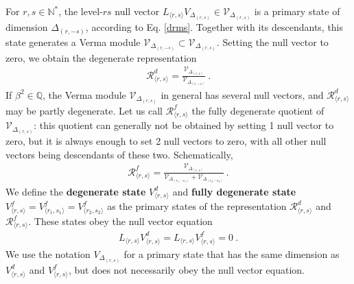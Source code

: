 \documentclass[12pt, a4paper]{article}
\newcommand{\myindex}[1]{\textbf{\boldmath #1}}
\begin{document}
For $r,s\in\mathbb{N}^*$, the level-$rs$ null vector $L_{\langle r,s\rangle}V_{\Delta_{(r,s)}}\in \mathcal{V}_{\Delta_{(r,s)}}$ is a primary state of dimension $\Delta_{(r,-s)}$, according to Eq. \eqref{drms}. Together with its descendants, this state generates a Verma module $\mathcal{V}_{\Delta_{(r,-s)}}\subset \mathcal{V}_{\Delta_{(r,s)}}$. Setting the null vector to zero, we obtain the degenerate representation 
\begin{align}
 \mathcal{R}^d_{\langle r,s\rangle} 
 =\frac{\mathcal{V}_{\Delta_{(r,s)}}}{\mathcal{V}_{\Delta_{(r,-s)}}}\ . 
 \label{rvv}
\end{align}
If $\beta^2\in \mathbb{Q}$, the Verma module $\mathcal{V}_{\Delta_{(r,s)}}$ in general has several null vectors, and $\mathcal{R}^d_{\langle r,s\rangle}$ may be partly degenerate. Let us call $\mathcal{R}^f_{\langle r,s\rangle}$ the fully degenerate quotient of  $\mathcal{V}_{\Delta_{(r,s)}}$: this quotient can generally not be obtained by setting 1 null vector to zero, but it is always enough to set 2 null vectors to zero, with all other null vectors being descendants of these two. Schematically,
\begin{align}
 \mathcal{R}^f_{\langle r,s\rangle} = \frac{\mathcal{V}_{\Delta_{(r,s)}}}{\mathcal{V}_{\Delta_{(r_1,-s_1)}}+ \mathcal{V}_{\Delta_{(r_2,-s_2)}}}\ .
\end{align}
We define the \myindex{degenerate state} $V^d_{\langle r,s\rangle}$ and \myindex{fully degenerate state} $V^f_{\langle r,s\rangle}=V^f_{\langle r_1,s_1\rangle}=V^f_{\langle r_2,s_2\rangle}$ as the primary states of the representation $\mathcal{R}^d_{\langle r,s\rangle}$ and 
$\mathcal{R}^f_{\langle r,s\rangle}$. These states obey the null vector equation
\begin{align}
L_{\langle r, s\rangle} V^d_{\langle r,s\rangle} = L_{\langle r, s\rangle} V^f_{\langle r,s\rangle} = 0\ .
\label{lvdz}
\end{align}
We use the notation $V_{\Delta_{(r,s)}}$ for a primary state that has the same dimension as $V^d_{\langle r,s\rangle}$ and $V^f_{\langle r,s\rangle}$, but does not necessarily obey the null vector equation. 
\end{document}

